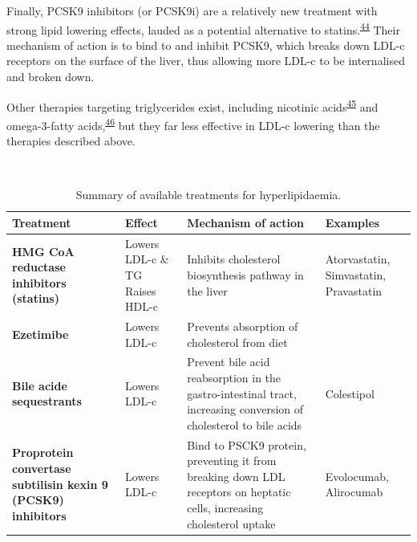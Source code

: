 \documentclass[a4paper, twoside]{templates/ociamthesis}
\begin{document}
Finally, PCSK9 inhibitors (or PCSK9i) are a relatively new treatment with strong lipid lowering effects, lauded as a potential alternative to statins.\textsuperscript{\protect\hyperlink{ref-chaudhary2017}{44}} Their mechanism of action is to bind to and inhibit PCSK9, which breaks down LDL-c receptors on the surface of the liver, thus allowing more LDL-c to be internalised and broken down.

Other therapies targeting triglycerides exist, including nicotinic acids\textsuperscript{\protect\hyperlink{ref-mckenney2004}{45}} and omega-3-fatty acids,\textsuperscript{\protect\hyperlink{ref-skulas2019}{46}} but they far less effective in LDL-c lowering than the therapies described above.

~



\begin{table}[H]

\caption{\label{tab:lipidTreatments-table}Summary of available treatments for hyperlipidaemia.}
\centering
\begin{tabular}[t]{>{\raggedright\arraybackslash}p{8em}>{\raggedright\arraybackslash}p{8em}>{\raggedright\arraybackslash}p{8em}>{\raggedright\arraybackslash}p{8em}}
\toprule
\textbf{Treatment} & \textbf{Effect} & \textbf{Mechanism of action} & \textbf{Examples}\\
\midrule
\textbf{HMG CoA reductase inhibitors (statins)} & Lowers LDL-c \& TG \newline Raises HDL-c & Inhibits cholesterol biosynthesis pathway in the liver & Atorvastatin, \newline Simvastatin, \newline Pravastatin\\
\midrule
\textbf{Ezetimibe} & Lowers LDL-c & Prevents absorption of cholesterol from diet & \\
\midrule
\textbf{Bile acide sequestrants} & Lowers LDL-c & Prevent bile acid reabsorption in the gastro-intestinal tract, increasing conversion of cholesterol to bile acids & Colestipol\\
\midrule
\textbf{Proprotein convertase subtilisin kexin 9 (PCSK9) inhibitors} & Lowers LDL-c & Bind to PSCK9 protein, preventing it from breaking down LDL receptors on heptatic cells, increasing cholesterol uptake & Evolocumab, \newline Alirocumab\\
\bottomrule
\end{tabular}
\end{table}
\end{document}
